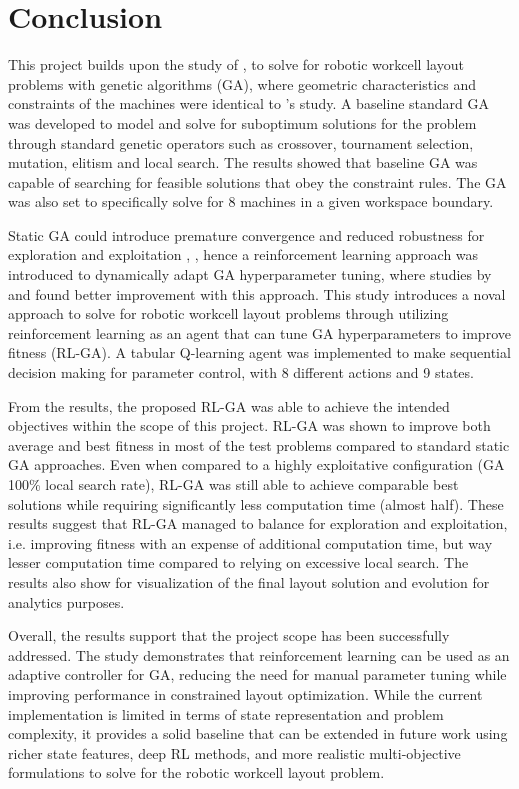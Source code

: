\documentclass{article}
\begin{document}
\newpage
\section{Conclusion}
This project builds upon the study of \parencite{sim2005rwl}, to solve for robotic workcell layout problems with genetic algorithms (GA), where geometric characteristics and constraints of the machines were identical to \textcite{sim2005rwl}'s study. A baseline standard GA was developed to model and solve for suboptimum solutions for the problem through standard genetic operators such as crossover, tournament selection, mutation, elitism and local search. The results showed that baseline GA was capable of searching for feasible solutions that obey the constraint rules. The GA was also set to specifically solve for 8 machines in a given workspace boundary.

Static GA could introduce premature convergence and reduced robustness for exploration and exploitation \parencite{eiben1999parametercontrol}, \parencite{karafotias2015trends}, hence a reinforcement learning approach was introduced to dynamically adapt GA hyperparameter tuning, where studies by \textcite{quevedo2021gecco} and \textcite{Woodcock2024Genetic} found better improvement with this approach. This study introduces a noval approach to solve for robotic workcell layout problems through utilizing reinforcement learning as an agent that can tune GA hyperparameters to improve fitness (RL-GA). A tabular Q-learning agent was implemented to make sequential decision making for parameter control, with 8 different actions and 9 states.

From the results, the proposed RL-GA was able to achieve the intended objectives within the scope of this project. RL-GA was shown to improve both average and best fitness in most of the test problems compared to standard static GA approaches. Even when compared to a highly exploitative configuration (GA 100\% local search rate), RL-GA was still able to achieve comparable best solutions while requiring significantly less computation time (almost half). These results suggest that RL-GA managed to balance for exploration and exploitation, i.e. improving fitness with an expense of additional computation time, but way lesser computation time compared to relying on excessive local search. The results also show for visualization of the final layout solution and evolution for analytics purposes.
 
Overall, the results support that the project scope has been successfully addressed. The study demonstrates that reinforcement learning can be used as an adaptive controller for GA, reducing the need for manual parameter tuning while improving performance in constrained layout optimization. While the current implementation is limited in terms of state representation and problem complexity, it provides a solid baseline that can be extended in future work using richer state features, deep RL methods, and more realistic multi-objective formulations to solve for the robotic workcell layout problem.
\end{document}
